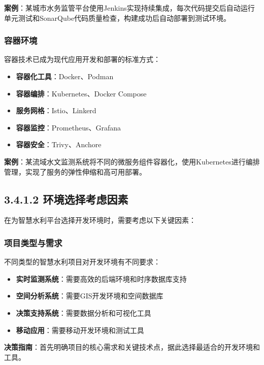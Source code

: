 \textbf{案例}：某城市水务监管平台使用Jenkins实现持续集成，每次代码提交后自动运行单元测试和SonarQube代码质量检查，构建成功后自动部署到测试环境。

\subsubsection{容器环境}\label{ux5bb9ux5668ux73afux5883}

容器技术已成为现代应用开发和部署的标准方式：

\begin{itemize}
\tightlist
\item
  \textbf{容器化工具}：Docker、Podman
\item
  \textbf{容器编排}：Kubernetes、Docker Compose
\item
  \textbf{服务网格}：Istio、Linkerd
\item
  \textbf{容器监控}：Prometheus、Grafana
\item
  \textbf{容器安全}：Trivy、Anchore
\end{itemize}

\textbf{案例}：某流域水文监测系统将不同的微服务组件容器化，使用Kubernetes进行编排管理，实现了服务的弹性伸缩和高可用部署。

\subsection{3.4.1.2
环境选择考虑因素}\label{ux73afux5883ux9009ux62e9ux8003ux8651ux56e0ux7d20}

在为智慧水利平台选择开发环境时，需要考虑以下关键因素：

\subsubsection{项目类型与需求}\label{ux9879ux76eeux7c7bux578bux4e0eux9700ux6c42}

不同类型的智慧水利项目对开发环境有不同要求：

\begin{itemize}
\tightlist
\item
  \textbf{实时监测系统}：需要高效的后端环境和时序数据库支持
\item
  \textbf{空间分析系统}：需要GIS开发环境和空间数据库
\item
  \textbf{决策支持系统}：需要数据分析和可视化工具
\item
  \textbf{移动应用}：需要移动开发环境和测试工具
\end{itemize}

\textbf{决策指南}：首先明确项目的核心需求和关键技术点，据此选择最适合的开发环境和工具。

